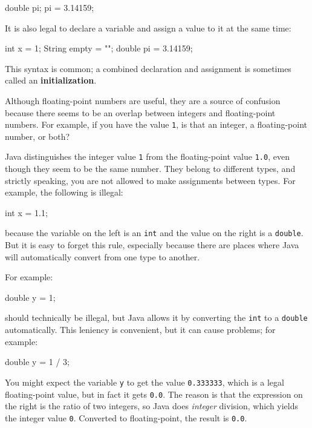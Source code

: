 \begin{code}
    double pi;
    pi = 3.14159;
\end{code}

It is also legal to declare a variable and assign a value to it at the same time:

\begin{code}
    int x = 1;
    String empty = "";
    double pi = 3.14159;
\end{code}


This syntax is common; a combined declaration and assignment is sometimes called an {\bf initialization}.

Although floating-point numbers are useful, they are a source of confusion because there seems to be an overlap between integers and floating-point numbers.
For example, if you have the value {\tt 1}, is that an integer, a floating-point number, or both?

Java distinguishes the integer value {\tt 1} from the floating-point value {\tt 1.0}, even though they seem to be the same number.
They belong to different types, and strictly speaking, you are not allowed to make assignments between types.
For example, the following is illegal:

\begin{code}
    int x = 1.1;
\end{code}

because the variable on the left is an {\tt int} and the value on the right is a {\tt double}.
But it is easy to forget this rule, especially because there are places where Java will automatically convert from one type to another.

For example:

\begin{code}
    double y = 1;
\end{code}

should technically be illegal, but Java allows it by converting the {\tt int} to a {\tt double} automatically.
This leniency is convenient, but it can cause problems; for example:

\begin{code}
    double y = 1 / 3;
\end{code}

You might expect the variable {\tt y} to get the value {\tt 0.333333}, which is a legal floating-point value, but in fact it gets {\tt 0.0}.
The reason is that the expression on the right is the ratio of two integers, so Java does {\em integer} division, which yields the integer value {\tt 0}.
Converted to floating-point, the result is {\tt 0.0}.

